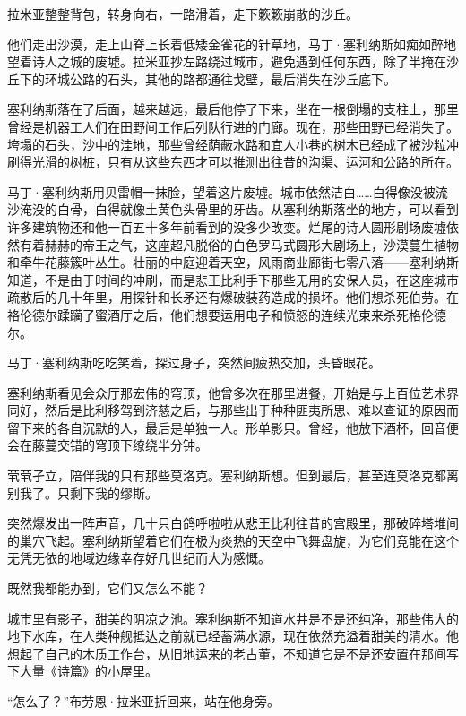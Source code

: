 \documentclass[AutoFakeBold=true]{book}
\begin{document}
拉米亚整整背包，转身向右，一路滑着，走下簌簌崩散的沙丘。

\vspace*{1em}

他们走出沙漠，走上山脊上长着低矮金雀花的针草地，马丁·塞利纳斯如痴如醉地望着诗人之城的废墟。拉米亚抄左路绕过城市，避免遇到任何东西，除了半掩在沙丘下的环城公路的石头，其他的路都通往戈壁，最后消失在沙丘底下。

塞利纳斯落在了后面，越来越远，最后他停了下来，坐在一根倒塌的支柱上，那里曾经是机器工人们在田野间工作后列队行进的门廊。现在，那些田野已经消失了。垮塌的石头，沙中的洼地，那些曾经荫蔽水路和宜人小巷的树木已经成了被沙粒冲刷得光滑的树桩，只有从这些东西才可以推测出往昔的沟渠、运河和公路的所在。

马丁·塞利纳斯用贝雷帽一抹脸，望着这片废墟。城市依然洁白……白得像没被流沙淹没的白骨，白得就像土黄色头骨里的牙齿。从塞利纳斯落坐的地方，可以看到许多建筑物还和他一百五十多年前看到的没多少改变。烂尾的诗人圆形剧场废墟依然有着赫赫的帝王之气，这座超凡脱俗的白色罗马式圆形大剧场上，沙漠蔓生植物和牵牛花藤簇叶丛生。壮丽的中庭迎着天空，风雨商业廊街七零八落——塞利纳斯知道，不是由于时间的冲刷，而是悲王比利手下那些无用的安保人员，在这座城市疏散后的几十年里，用探针和长矛还有爆破装药造成的损坏。他们想杀死伯劳。在袼伦德尔蹂躏了蜜酒厅之后，他们想要运用电子和愤怒的连续光束来杀死格伦德尔。

马丁·塞利纳斯吃吃笑着，探过身子，突然间疲热交加，头昏眼花。

塞利纳斯看见会众厅那宏伟的穹顶，他曾多次在那里进餐，开始是与上百位艺术界同好，然后是比利移驾到济慈之后，与那些出于种种匪夷所思、难以查证的原因而留下来的各自沉默的人，最后是单独一人。形单影只。曾经，他放下酒杯，回音便会在藤蔓交错的穹顶下缭绕半分钟。

{\kaishu 茕茕孑立，陪伴我的只有那些莫洛克。}塞利纳斯想。{\kaishu 但到最后，甚至连莫洛克都离别我了。只剩下我的缪斯。}

突然爆发出一阵声音，几十只白鸽呼啦啦从悲王比利往昔的宫殿里，那破碎塔堆间的巢穴飞起。塞利纳斯望着它们在极为炎热的天空中飞舞盘旋，为它们竞能在这个无凭无依的地域边缘幸存好几世纪而大为感慨。

{\kaishu 既然我都能办到，它们又怎么不能？}

城市里有影子，甜美的阴凉之池。塞利纳斯不知道水井是不是还纯净，那些伟大的地下水库，在人类种舰抵达之前就已经蓄满水源，现在依然充溢着甜美的清水。他想起了自己的木质工作台，从旧地运来的老古董，不知道它是不是还安置在那间写下大量《诗篇》的小屋里。

``怎么了？''布劳恩·拉米亚折回来，站在他身旁。
\end{document}
